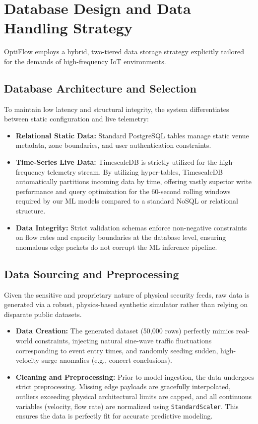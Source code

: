 \documentclass[11pt, a4paper]{article}
\begin{document}
\section{Database Design and Data Handling Strategy}
OptiFlow employs a hybrid, two-tiered data storage strategy explicitly tailored for the demands of high-frequency IoT environments.

\subsection{Database Architecture and Selection}
To maintain low latency and structural integrity, the system differentiates between static configuration and live telemetry:
\begin{itemize}[leftmargin=*]
    \item \textbf{Relational Static Data:} Standard PostgreSQL tables manage static venue metadata, zone boundaries, and user authentication constraints.
    \item \textbf{Time-Series Live Data:} TimescaleDB is strictly utilized for the high-frequency telemetry stream. By utilizing hyper-tables, TimescaleDB automatically partitions incoming data by time, offering vastly superior write performance and query optimization for the 60-second rolling windows required by our ML models compared to a standard NoSQL or relational structure.
    \item \textbf{Data Integrity:} Strict validation schemas enforce non-negative constraints on flow rates and capacity boundaries at the database level, ensuring anomalous edge packets do not corrupt the ML inference pipeline.
\end{itemize}

\subsection{Data Sourcing and Preprocessing}
Given the sensitive and proprietary nature of physical security feeds, raw data is generated via a robust, physics-based synthetic simulator rather than relying on disparate public datasets.
\begin{itemize}[leftmargin=*]
    \item \textbf{Data Creation:} The generated dataset (50,000 rows) perfectly mimics real-world constraints, injecting natural sine-wave traffic fluctuations corresponding to event entry times, and randomly seeding sudden, high-velocity surge anomalies (e.g., concert conclusions).
    \item \textbf{Cleaning and Preprocessing:} Prior to model ingestion, the data undergoes strict preprocessing. Missing edge payloads are gracefully interpolated, outliers exceeding physical architectural limits are capped, and all continuous variables (velocity, flow rate) are normalized using \texttt{StandardScaler}. This ensures the data is perfectly fit for accurate predictive modeling.
\end{itemize}
\end{document}
